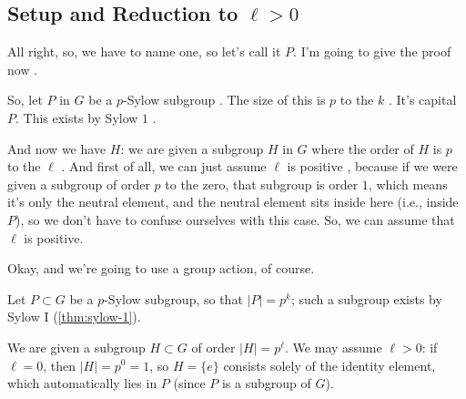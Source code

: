 \begin{proofWrapper}

\subsection{Setup and Reduction to \texorpdfstring{$\ell > 0$}{l > 0}}

\begin{speech}[00:19:58 - 00:21:10]
All right, so, we have to name one, so let's call it $P$. I'm going to give the proof now .

So, let $P$ in $G$ be a $p$-Sylow subgroup . The size of this is $p$ to the $k$ . It's capital $P$. This exists by Sylow $1$ .

And now we have $H$: we are given a subgroup $H$ in $G$ where the order of $H$ is $p$ to the $\ell$ . And first of all, we can just assume $\ell$ is positive , because if we were given a subgroup of order $p$ to the zero, that subgroup is order $1$, which means it's only the neutral element, and the neutral element sits inside here (i.e., inside $P$), so we don't have to confuse ourselves with this case. So, we can assume that $\ell$ is positive.

Okay, and we're going to use a group action, of course. 
\end{speech}

\begin{content}
Let $P \subset G$ be a $p$-Sylow subgroup, so that $|P| = p^k$; such a subgroup exists by Sylow I (\cref{thm:sylow-1}).

We are given a subgroup $H \subset G$ of order $|H| = p^\ell$. We may assume $\ell > 0$: if $\ell = 0$, then $|H| = p^0 = 1$, so $H = \{e\}$ consists solely of the identity element, which automatically lies in $P$ (since $P$ is a subgroup of $G$).
\end{content}

\begin{hidden}
\end{hidden}


\end{proofWrapper}
